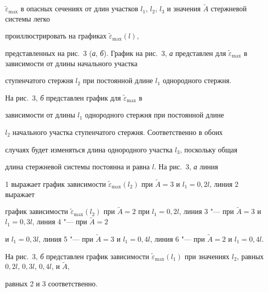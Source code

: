 $\tilde {\varepsilon}_{\max }$ в опасных сечениях от длин участков $l_1

$, $l_2 $, $l_3 $ и значения $\tilde {A}$ стержневой системы легко

проиллюстрировать на графиках $\tilde {\varepsilon}_{\max }(l)$,

представленных на рис.~3 ({\sl а}, {\sl б}). График на рис.~3, {\sl а} представлен для $\tilde

{\varepsilon}_{\max} $ в зависимости от длины начального участка

ступенчатого стержня $l_{2}$ при постоянной длине $l_{1}$ однородного стержня.

На рис.~3, {\sl б} представлен график для $\tilde {\varepsilon }_{\max}$ в

зависимости от длины $l_{1}$ однородного стержня при постоянной длине

$l_{2}$ начального участка ступенчатого стержня. Соответственно в обоих

случаях будет изменяться длина однородного участка $l_{3}$, поскольку общая

длина стержневой системы постоянна и равна $l$. На рис.~3, {\sl а} линия

1 выражает график зависимости $\tilde {\varepsilon}_{\max} (l_2)$ при $\tilde {A}=3$ и $l_1=0,2l$, линия 2 выражает

график зависимости $\tilde {\varepsilon}_{\max} (l_2)$ при $\tilde

{A}=2$ при $l_1 =0,2l$, линия 3 "--- при $\tilde

{A}=3$ и $l_1 =0,3l$, линия 4 "--- при $\tilde {A}=2$

и $l_1=0,3l$, линия 5 "--- при $\tilde {A}=3$ и $l_1

=0,4l$, линия 6 "--- при $\tilde {A}=2$ и $l_1 =0,4l$.

На рис.~3, {\sl б} представлен график зависимости $\tilde {\varepsilon }_{\max }(l_1 )$ при значениях $l_2$, равных $0,2l$, $0,3l$, $0,4l$, и $\tilde {A}$,

равных 2 и 3 соответственно.



\smallskip





